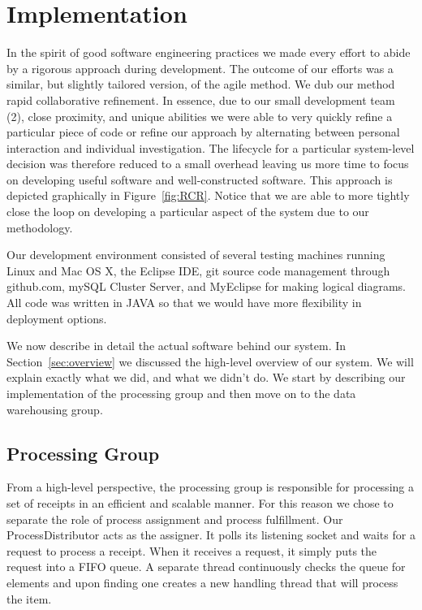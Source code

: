 \section{Implementation}
\label{sec:implementation}

In the spirit of good software engineering practices we made every
effort to abide by a rigorous approach during development. The outcome
of our efforts was a similar, but slightly tailored version, of the
agile method. We dub our method rapid collaborative refinement. In
essence, due to our small development team (2), close proximity, and
unique abilities we were able to very quickly refine a particular
piece of code or refine our approach by alternating between personal
interaction and individual investigation. The lifecycle for a
particular system-level decision was therefore reduced to a small
overhead leaving us more time to focus on developing useful software
and well-constructed software. This approach is depicted graphically
in Figure~\ref{fig:RCR}. Notice that we are able to more tightly close
the loop on developing a particular aspect of the system due to our
methodology.



Our development environment consisted of several testing machines
running Linux and Mac OS X, the Eclipse IDE, git source code
management through github.com, mySQL Cluster Server, and MyEclipse for
making logical diagrams. All code was written in JAVA so that we
would have more flexibility in deployment options.

We now describe in detail the actual software behind our system. In
Section~\ref{sec:overview} we discussed the high-level overview of our
system. We will explain exactly what we did, and what we didn't
do. We start by describing our implementation of the processing
group and then move on to the data warehousing group.

\subsection{Processing Group}
\label{sec:implementation.processing}

From a high-level perspective, the processing group is responsible for
processing a set of receipts in an efficient and scalable manner. For
this reason we chose to separate the role of process assignment and
process fulfillment. Our ProcessDistributor acts as the assigner. It
polls its listening socket and waits for a request to process a
receipt. When it receives a request, it simply puts the request into a
FIFO queue. A separate thread continuously checks the queue for
elements and upon finding one creates a new handling thread that will
process the item.

